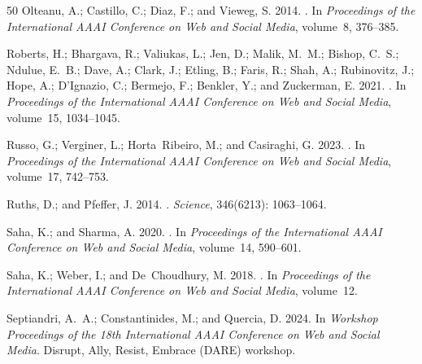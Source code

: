 \begin{thebibliography}{50}
Olteanu, A.; Castillo, C.; Diaz, F.; and Vieweg, S. 2014.
.
\newblock In \emph{Proceedings of the International AAAI Conference on Web and Social Media}, volume~8, 376--385.

Roberts, H.; Bhargava, R.; Valiukas, L.; Jen, D.; Malik, M.~M.; Bishop, C.~S.; Ndulue, E.~B.; Dave, A.; Clark, J.; Etling, B.; Faris, R.; Shah, A.; Rubinovitz, J.; Hope, A.; D'Ignazio, C.; Bermejo, F.; Benkler, Y.; and Zuckerman, E. 2021.
.
\newblock In \emph{Proceedings of the International AAAI Conference on Web and Social Media}, volume~15, 1034--1045.

Russo, G.; Verginer, L.; Horta~Ribeiro, M.; and Casiraghi, G. 2023.
.
\newblock In \emph{Proceedings of the International AAAI Conference on Web and Social Media}, volume~17, 742--753.

Ruths, D.; and Pfeffer, J. 2014.
.
\newblock \emph{Science}, 346(6213): 1063--1064.

Saha, K.; and Sharma, A. 2020.
.
\newblock In \emph{Proceedings of the International AAAI Conference on Web and Social Media}, volume~14, 590--601.

Saha, K.; Weber, I.; and De~Choudhury, M. 2018.
.
\newblock In \emph{Proceedings of the International AAAI Conference on Web and Social Media}, volume~12.

Septiandri, A.~A.; Constantinides, M.; and Quercia, D. 2024.
\newblock In \emph{Workshop Proceedings of the 18th International AAAI Conference on Web and Social Media}.
\newblock Disrupt, Ally, Resist, Embrace (DARE) workshop.


\end{thebibliography}

